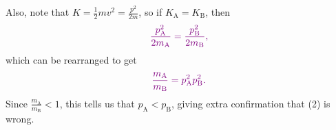 \documentclass[]{article}
\begin{document}
\begin{TeacherMargin}
\begin{enumerate}[(1)]
	{\color{violet}Also, note that $K=\frac{1}{2}mv^{2}=\frac{p^{2}}{2m}$, so if $K_{\text{A}} = K_{\text{B}}$, then}
	\begin{align*}
		\color{violet}
		\frac{p_{\text{A}}^{2}}{2m_{\text{A}}} = \frac{p_{\text{B}}^{2}}{2m_{\text{B}}},
	\end{align*}
	{\color{violet}which can be rearranged to get}
	\begin{align*}
		\color{violet}
		\frac{m_{\text{A}}}{m_{\text{B}}} = {p_{\text{A}}^{2}}{p_{\text{B}}^{2}}.
	\end{align*}
	{\color{violet}Since $\frac{m_{\text{A}}}{m_{\text{B}}} < 1$, this tells us that $p_{\text{A}}<p_{\text{B}}$, giving extra confirmation that (2) is wrong.}
\end{enumerate}
\end{TeacherMargin}
\begin{PresentSpace}
\vspace{-10pt}

\end{PresentSpace}
\end{document}
